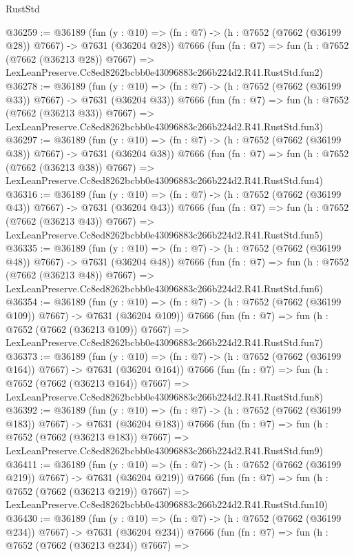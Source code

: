 \begin{lexlean}{RustStd}
\begin{coremodule}
@36259 := @36189
    (fun (y : @10) => (fn : @7) -> (h : @7652 (@7662 (@36199 @28)) @7667) -> @7631 (@36204 @28))
    @7666
    (fun (fn : @7) =>
    fun (h : @7652 (@7662 (@36213 @28)) @7667) =>
    LexLeanPreserve.Cc8ed8262bcbb0e43096883c266b224d2.R41.RustStd.fun2)
@36278 := @36189
    (fun (y : @10) => (fn : @7) -> (h : @7652 (@7662 (@36199 @33)) @7667) -> @7631 (@36204 @33))
    @7666
    (fun (fn : @7) =>
    fun (h : @7652 (@7662 (@36213 @33)) @7667) =>
    LexLeanPreserve.Cc8ed8262bcbb0e43096883c266b224d2.R41.RustStd.fun3)
@36297 := @36189
    (fun (y : @10) => (fn : @7) -> (h : @7652 (@7662 (@36199 @38)) @7667) -> @7631 (@36204 @38))
    @7666
    (fun (fn : @7) =>
    fun (h : @7652 (@7662 (@36213 @38)) @7667) =>
    LexLeanPreserve.Cc8ed8262bcbb0e43096883c266b224d2.R41.RustStd.fun4)
@36316 := @36189
    (fun (y : @10) => (fn : @7) -> (h : @7652 (@7662 (@36199 @43)) @7667) -> @7631 (@36204 @43))
    @7666
    (fun (fn : @7) =>
    fun (h : @7652 (@7662 (@36213 @43)) @7667) =>
    LexLeanPreserve.Cc8ed8262bcbb0e43096883c266b224d2.R41.RustStd.fun5)
@36335 := @36189
    (fun (y : @10) => (fn : @7) -> (h : @7652 (@7662 (@36199 @48)) @7667) -> @7631 (@36204 @48))
    @7666
    (fun (fn : @7) =>
    fun (h : @7652 (@7662 (@36213 @48)) @7667) =>
    LexLeanPreserve.Cc8ed8262bcbb0e43096883c266b224d2.R41.RustStd.fun6)
@36354 := @36189
    (fun (y : @10) => (fn : @7) -> (h : @7652 (@7662 (@36199 @109)) @7667) -> @7631 (@36204 @109))
    @7666
    (fun (fn : @7) =>
    fun (h : @7652 (@7662 (@36213 @109)) @7667) =>
    LexLeanPreserve.Cc8ed8262bcbb0e43096883c266b224d2.R41.RustStd.fun7)
@36373 := @36189
    (fun (y : @10) => (fn : @7) -> (h : @7652 (@7662 (@36199 @164)) @7667) -> @7631 (@36204 @164))
    @7666
    (fun (fn : @7) =>
    fun (h : @7652 (@7662 (@36213 @164)) @7667) =>
    LexLeanPreserve.Cc8ed8262bcbb0e43096883c266b224d2.R41.RustStd.fun8)
@36392 := @36189
    (fun (y : @10) => (fn : @7) -> (h : @7652 (@7662 (@36199 @183)) @7667) -> @7631 (@36204 @183))
    @7666
    (fun (fn : @7) =>
    fun (h : @7652 (@7662 (@36213 @183)) @7667) =>
    LexLeanPreserve.Cc8ed8262bcbb0e43096883c266b224d2.R41.RustStd.fun9)
@36411 := @36189
    (fun (y : @10) => (fn : @7) -> (h : @7652 (@7662 (@36199 @219)) @7667) -> @7631 (@36204 @219))
    @7666
    (fun (fn : @7) =>
    fun (h : @7652 (@7662 (@36213 @219)) @7667) =>
    LexLeanPreserve.Cc8ed8262bcbb0e43096883c266b224d2.R41.RustStd.fun10)
@36430 := @36189
    (fun (y : @10) => (fn : @7) -> (h : @7652 (@7662 (@36199 @234)) @7667) -> @7631 (@36204 @234))
    @7666
    (fun (fn : @7) =>
    fun (h : @7652 (@7662 (@36213 @234)) @7667) =>

\end{coremodule}
\end{lexlean}
